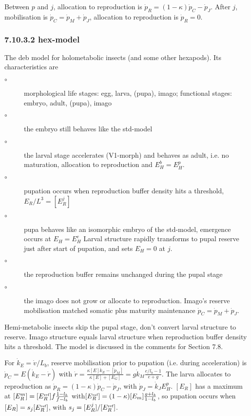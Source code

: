 Between $p$ and $j$, allocation to reproduction is $\dot{p}_R = (1 - \kappa) \dot{p}_C - \dot{p}_J$.
After $j$, mobilisation is $\dot{p}_C = \dot{p}_M + \dot{p}_J$, allocation to reproduction is $\dot{p}_R = 0$.

\subsubsection*{7.10.3.2 hex-model}
{}
\label{sec_c:hex}

The {\sc deb} model for holometabolic insects (and some other hexapods). Its characteristics are
\begin{description}
  \item[$\circ$] morphological life stages: egg, larva, (pupa), imago; functional stages: embryo, adult, (pupa), imago
	
  \item[$\circ$] the embryo still behaves like the std-model
	
  \item[$\circ$] the larval stage accelerates (V1-morph) and behaves as adult, i.e. no maturation, allocation to reproduction and $E_H^b = E_H^p$.
	
  \item[$\circ$] pupation occurs when reproduction buffer density hits a threshold, $E_R/ L^3 = [E_R^j]$
	
  \item[$\circ$] pupa behaves like an isomorphic embryo of the std-model, emergence occurs at $E_H = E_H^e$
	  Larval structure rapidly transforms to pupal reserve just after start of pupation, and sets $E_H = 0$ at $j$.
		
  \item[$\circ$] the reproduction buffer remains unchanged during the pupal stage
	
  \item[$\circ$] the imago does not grow or allocate to reproduction. 
	  Imago's reserve mobilisation matched somatic plus maturity maintenance $\dot{p}_C = \dot{p}_M + \dot{p}_J$.
\end{description}
Hemi-metabolic insects skip the pupal stage, don't convert larval structure to reserve. 
Imago structure equals larval structure when reproduction buffer density hits a threshold.
The model is discussed in the comments for Section 7.8.

For $\dot{k}_E = \dot{v}/ L_b$, reserve mobilisation prior to pupation (i.e. during acceleration) is $\dot{p}_C = E (\dot{k}_E - \dot{r})$ 
  with $\dot{r} = \frac{\kappa [E] \dot{k}_E - [\dot{p}_M]} {\kappa [E] + [E_G]} = g \dot{k}_M \frac{e/ l_b - 1} {e + g}$.
The larva allocates to reproduction as $\dot{p}_R = (1- \kappa) \dot{p}_C - \dot{p}_J$, with $\dot{p}_J = \dot{k}_J E_H^p$.
$[E_R]$ has a maximum at $[E_R^m] = [E_R^{\mbox{\tiny ref}}] f \frac{1 - l_b} {f - l_b}$ with$[E_R^{\mbox{\tiny ref}}] = (1 - \kappa) [E_m] \frac{g + l_b} {1 - l_b}$, so pupation occurs when $[E_R] = s_j [E_R^{\mbox{\tiny ref}}]$, with $s_j = [E_R^j]/ [E_R^{\mbox{\tiny ref}}]$.

